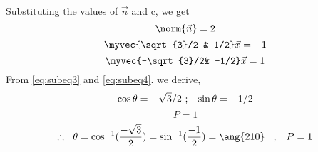 \documentclass[journal,12pt,twocolumn]{IEEEtran}
\begin{document}
Substituting the values of $\vec{n}$ and c, we get
\begin{equation}\label{eq:subeq4}
		\norm{\vec{n}} = 2
\end{equation}
\begin{equation}
		\myvec{\sqrt{3}/2 & 1/2}\vec{x} = -1
\end{equation}
\begin{equation}
		\myvec{-\sqrt{3}/2& -1/2}\vec{x} = 1		
\end{equation}	
From \eqref{eq:subeq3} and \eqref{eq:subeq4}. we derive,
\begin{equation}
		\cos\theta = -\sqrt{3}/2\ ;\hspace{3mm} \sin\theta = -1/2
\end{equation}
\begin{equation}
		 P = 1
\end{equation}
\begin{equation}
		\therefore\ \hspace{1mm} \theta = \cos^{-1}(\frac{-\sqrt{3}}{2}) = \sin^{-1}(\frac{-1}{2}) = \ang{210}\hspace{3mm},\hspace{3mm} P = 1
	\end{equation}
\end{document}
